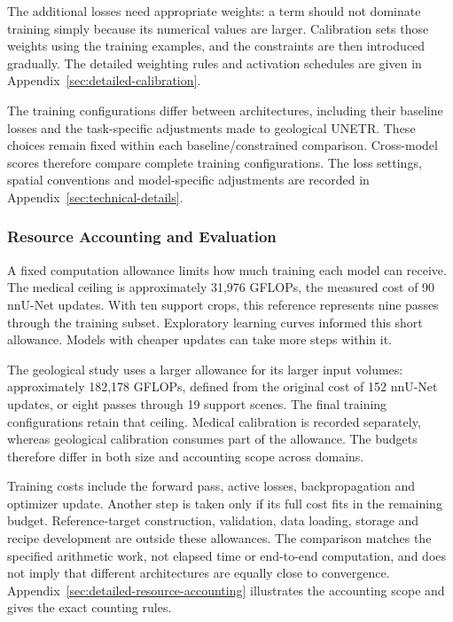\documentclass[12pt,a4paper]{article}
\begin{document}
The additional losses need appropriate weights: a term should not
dominate training simply because its numerical values are larger.
Calibration sets those weights using the training examples, and the
constraints are then introduced gradually. The detailed weighting rules
and activation schedules are given in
Appendix~\ref{sec:detailed-calibration}.

The training configurations differ between architectures, including
their baseline losses and the task-specific adjustments made to
geological UNETR. These choices remain fixed within each
baseline/constrained comparison. Cross-model scores therefore compare
complete training configurations. The loss settings, spatial conventions
and model-specific adjustments are recorded in
Appendix~\ref{sec:technical-details}.

\subsubsection{Resource Accounting and Evaluation}

A fixed computation allowance limits how much training each model can
receive. The medical ceiling is approximately 31,976 GFLOPs, the
measured cost of 90 nnU-Net updates. With ten support crops, this
reference represents nine passes through the training subset.
Exploratory learning curves informed this short allowance. Models
with cheaper updates can take more steps within it.

The geological study uses a larger allowance for its larger input
volumes: approximately 182,178 GFLOPs, defined from the original cost
of 152 nnU-Net updates, or eight passes through 19 support scenes.
The final training configurations retain that ceiling. Medical
calibration is recorded separately, whereas geological calibration
consumes part of the allowance. The budgets therefore differ in both
size and accounting scope across domains.

Training costs include the forward pass, active losses, backpropagation
and optimizer update. Another step is taken only if its full cost fits
in the remaining budget. Reference-target construction, validation,
data loading, storage and recipe development are outside these
allowances. The comparison matches the specified arithmetic work,
not elapsed time or end-to-end computation, and does not imply that
different architectures are equally close to convergence.
Appendix~\ref{sec:detailed-resource-accounting} illustrates the accounting
scope and gives the exact counting rules.
\end{document}
